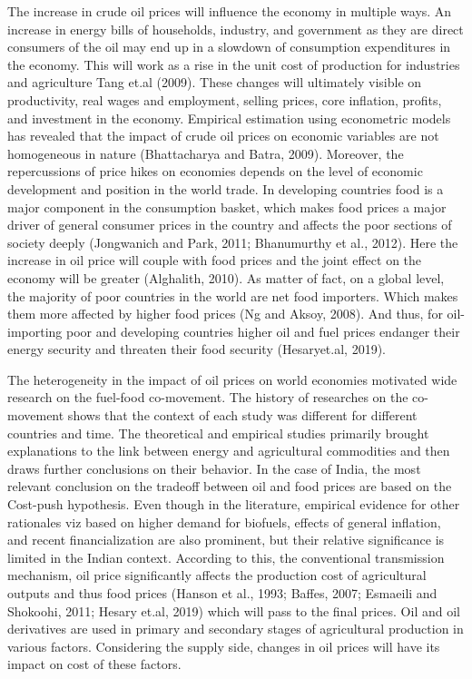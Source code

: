 \documentclass[a4paper,12pt]{article}
\begin{document}
The increase in crude oil prices will influence the economy in multiple ways. An increase in energy bills of households, industry, and government as they are direct consumers of the oil may end up in a slowdown of consumption expenditures in the economy. This will work as a rise in the unit cost of production for industries and agriculture Tang et.al (2009). These changes will ultimately visible on productivity, real wages and employment, selling prices, core inflation, profits, and investment in the economy. Empirical estimation using econometric models has revealed that the impact of crude oil prices on economic variables are not homogeneous in nature (Bhattacharya and Batra, 2009). Moreover, the repercussions of price hikes on economies depends on the level of economic development and position in the world trade.  In developing countries food is a major component in the consumption basket, which makes food prices a major driver of general consumer prices in the country and affects the poor sections of society deeply
(Jongwanich and Park, 2011; Bhanumurthy et al., 2012). Here the increase in oil price will couple with food prices and the joint effect on the economy will be greater (Alghalith, 2010). As matter of fact, on a global level, the majority of poor countries in the world are net food importers. Which makes them more affected by higher food prices (Ng and Aksoy, 2008). And thus, for oil-importing poor and developing countries higher oil and fuel prices endanger their energy security and threaten their food security (Hesaryet.al, 2019).

The heterogeneity in the impact of oil prices on world economies motivated wide research on the fuel-food co-movement. The history of researches on the co-movement shows that the context of each study was different for different countries and time. The theoretical and empirical studies primarily brought explanations to the link between energy and agricultural commodities and then draws further conclusions on their behavior. In the case of India, the most relevant conclusion on the tradeoff between oil and food prices are based on the Cost-push hypothesis. Even though in the literature, empirical evidence for other rationales viz based on higher demand for biofuels, effects of general inflation, and recent financialization are also prominent, but their relative significance is limited in the Indian context. According to this, the conventional transmission mechanism, oil price significantly affects the production cost of agricultural outputs and thus food prices (Hanson et al., 1993; Baffes, 2007; Esmaeili and Shokoohi, 2011; Hesary et.al, 2019) which will pass to the final prices. Oil and oil derivatives are used in primary and secondary stages of agricultural production in various factors. Considering the supply side, changes in oil prices will have its impact on cost of these factors.
\end{document}
